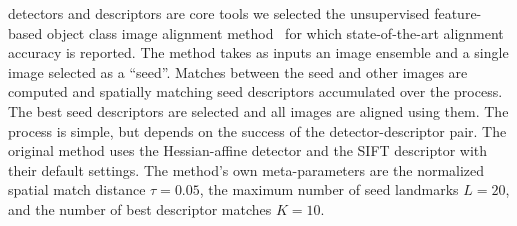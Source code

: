 \documentclass[review]{elsarticle}
\begin{document}
detectors and descriptors are core tools we selected
the unsupervised feature-based object class image alignment
method~\cite{LanKam:2011} for which state-of-the-art alignment
accuracy is reported. The method takes as inputs an
image ensemble and a single image selected as a ``seed''.
Matches between the seed and other
images are computed and spatially matching seed descriptors accumulated
over the process. The best seed descriptors are selected and all
images are aligned using them.
The process is simple, but depends on the success of the
detector-descriptor pair.
The original method uses the Hessian-affine detector and the
SIFT descriptor with their default settings. The
method's own meta-parameters are the normalized spatial match
distance $\tau=0.05$, the maximum number of seed landmarks $L=20$,
and the number of best descriptor matches $K=10$.
\end{document}
